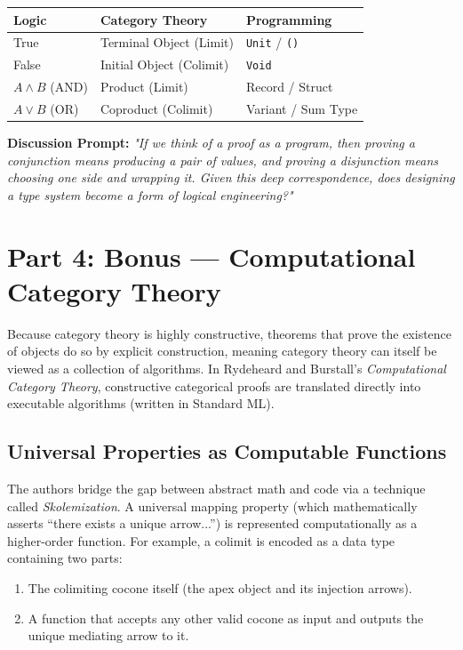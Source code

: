 \documentclass{article}
\begin{document}
\begin{center}
\begin{tabular}{@{}lll@{}}
\toprule
\textbf{Logic} & \textbf{Category Theory} & \textbf{Programming} \\
\midrule
True & Terminal Object (Limit) & \texttt{Unit} / \texttt{()} \\
False & Initial Object (Colimit) & \texttt{Void} \\
$A \land B$ (AND) & Product (Limit) & Record / Struct \\
$A \lor B$ (OR) & Coproduct (Colimit) & Variant / Sum Type \\
\bottomrule
\end{tabular}
\end{center}

\textbf{Discussion Prompt:} \textit{"If we think of a proof as a program, then proving a conjunction means producing a pair of values, and proving a disjunction means choosing one side and wrapping it. Given this deep correspondence, does designing a type system become a form of logical engineering?"}

\section{Part 4: Bonus --- Computational Category Theory}
Because category theory is highly constructive, theorems that prove the existence of objects do so by explicit construction, meaning category theory can itself be viewed as a collection of algorithms. In Rydeheard and Burstall's \textit{Computational Category Theory}, constructive categorical proofs are translated directly into executable algorithms (written in Standard ML).

\subsection{Universal Properties as Computable Functions}
The authors bridge the gap between abstract math and code via a technique called \textit{Skolemization}. A universal mapping property (which mathematically asserts ``there exists a unique arrow...'') is represented computationally as a higher-order function. 
For example, a colimit is encoded as a data type containing two parts:
\begin{enumerate}
    \item The colimiting cocone itself (the apex object and its injection arrows).
    \item A function that accepts any other valid cocone as input and outputs the unique mediating arrow to it.
\end{enumerate}
\end{document}

